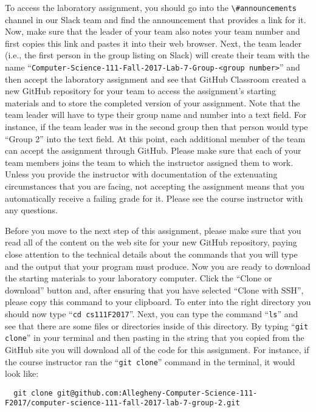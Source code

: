 \documentclass[11pt]{article}
\newcommand{\command}[1]{``\lstinline{#1}''}
\newcommand{\channel}[1]{\lstinline{#1}}
\begin{document}
To access the laboratory assignment, you should go into the \channel{\#announcements} channel in our Slack team and find
the announcement that provides a link for it. Now, make sure that the leader of your team also notes your team number
and first copies this link and pastes it into their web browser. Next, the team leader (i.e., the first person in the
group listing on Slack) will create their team with the name \command{Computer-Science-111-Fall-2017-Lab-7-Group-<group
number>} and then accept the laboratory assignment and see that GitHub Classroom created a new GitHub repository for
your team to access the assignment's starting materials and to store the completed version of your assignment. Note that
the team leader will have to type their group name and number into a text field. For instance, if the team leader was in
the second group then that person would type ``Group 2'' into the text field. At this point, each additional member of
the team can accept the assignment through GitHub. Please make sure that each of your team members joins the team to
which the instructor assigned them to work. Unless you provide the instructor with documentation of the extenuating
circumstances that you are facing, not accepting the assignment means that you automatically receive a failing grade for
it. Please see the course instructor with any questions.

Before you move to the next step of this assignment, please make sure that you read all of the content on the web site
for your new GitHub repository, paying close attention to the technical details about the commands that you will type
and the output that your program must produce. Now you are ready to download the starting materials to your laboratory
computer. Click the ``Clone or download'' button and, after ensuring that you have selected ``Clone with SSH'', please
copy this command to your clipboard. To enter into the right directory you should now type \command{cd cs111F2017}.
Next, you can type the command \command{ls} and see that there are some files or directories inside of this directory.
By typing \command{git clone} in your terminal and then pasting in the string that you copied from the GitHub site you
will download all of the code for this assignment. For instance, if the course instructor ran the \command{git clone}
command in the terminal, it would look like:

\begin{lstlisting}
  git clone git@github.com:Allegheny-Computer-Science-111-F2017/computer-science-111-fall-2017-lab-7-group-2.git
\end{lstlisting}
\end{document}
